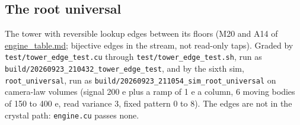 \subsection{\texorpdfstring{The root universal}{The root universal}}

The tower with reversible lookup edges between its floors (M20 and A14 of \hyperref[chap:engine-table]{engine\_\allowbreak{}table.md}; bijective edges in the stream, not read-only taps). Graded by \texttt{test/\allowbreak{}tower\_\allowbreak{}edge\_\allowbreak{}test.\allowbreak{}cu} through \texttt{test/\allowbreak{}tower\_\allowbreak{}edge\_\allowbreak{}test.\allowbreak{}sh}, run as \texttt{build/\allowbreak{}20260923\_\allowbreak{}210432\_\allowbreak{}tower\_\allowbreak{}edge\_\allowbreak{}test}, and by the sixth sim, \texttt{root\_\allowbreak{}universal}, run as \texttt{build/\allowbreak{}20260923\_\allowbreak{}211054\_\allowbreak{}sim\_\allowbreak{}root\_\allowbreak{}universal} on camera-law volumes (signal 200 e plus a ramp of 1 e a column, 6 moving bodies of 150 to 400 e, read variance 3, fixed pattern 0 to 8). The edges are not in the crystal path: \texttt{engine.\allowbreak{}cu} passes none.

